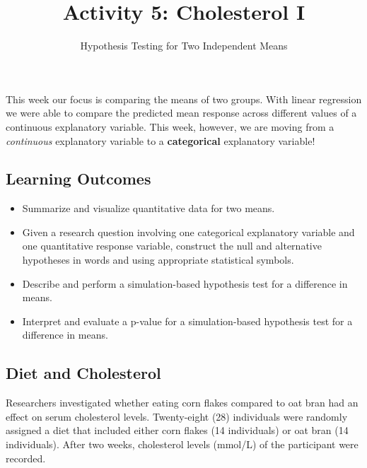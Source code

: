 \documentclass[
  letterpaper,
  DIV=11,
  numbers=noendperiod]{scrartcl}
\title{Activity 5: Cholesterol I}
\subtitle{Hypothesis Testing for Two Independent Means}
\author{}
\date{}
\begin{document}
\maketitle
\ifdefined\Shaded\renewenvironment{Shaded}{\begin{tcolorbox}[interior hidden, enhanced, frame hidden, borderline west={3pt}{0pt}{shadecolor}, boxrule=0pt, breakable, sharp corners]}{\end{tcolorbox}}\fi

This week our focus is comparing the means of two groups. With linear
regression we were able to compare the predicted mean response across
different values of a continuous explanatory variable. This week,
however, we are moving from a \emph{continuous} explanatory variable to
a \textbf{categorical} explanatory variable!

\hypertarget{learning-outcomes}{%
\subsection{Learning Outcomes}\label{learning-outcomes}}

\begin{itemize}
\item
  Summarize and visualize quantitative data for two means.
\item
  Given a research question involving one categorical explanatory
  variable and one quantitative response variable, construct the null
  and alternative hypotheses in words and using appropriate statistical
  symbols.
\item
  Describe and perform a simulation-based hypothesis test for a
  difference in means.
\item
  Interpret and evaluate a p-value for a simulation-based hypothesis
  test for a difference in means.
\end{itemize}

\hypertarget{diet-and-cholesterol}{%
\subsection{Diet and Cholesterol}\label{diet-and-cholesterol}}

Researchers investigated whether eating corn flakes compared to oat bran
had an effect on serum cholesterol levels. Twenty-eight (28) individuals
were randomly assigned a diet that included either corn flakes (14
individuals) or oat bran (14 individuals). After two weeks, cholesterol
levels (mmol/L) of the participant were recorded.
\end{document}
